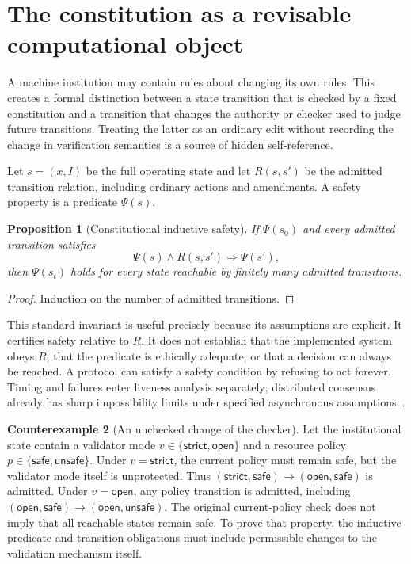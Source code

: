\documentclass[11pt,letterpaper]{article}
\theoremstyle{plain}
\newtheorem{proposition}{Proposition}[section]
\theoremstyle{definition}
\newtheorem{counterexample}[proposition]{Counterexample}
\theoremstyle{remark}
\begin{document}
\section{The constitution as a revisable computational object}\label{sec:constitution}

A machine institution may contain rules about changing its own rules. This creates a formal distinction between a state transition that is checked by a fixed constitution and a transition that changes the authority or checker used to judge future transitions. Treating the latter as an ordinary edit without recording the change in verification semantics is a source of hidden self-reference.

Let $s=(x,I)$ be the full operating state and let $R(s,s')$ be the admitted transition relation, including ordinary actions and amendments. A safety property is a predicate $\Psi(s)$.

\begin{proposition}[Constitutional inductive safety]\label{prop:safety}
If $\Psi(s_0)$ and every admitted transition satisfies
\[
\Psi(s)\wedge R(s,s')\Longrightarrow\Psi(s'),
\]
then $\Psi(s_t)$ holds for every state reachable by finitely many admitted transitions.
\end{proposition}
\begin{proof}
Induction on the number of admitted transitions.
\end{proof}

This standard invariant is useful precisely because its assumptions are explicit. It certifies safety relative to $R$. It does not establish that the implemented system obeys $R$, that the predicate is ethically adequate, or that a decision can always be reached. A protocol can satisfy a safety condition by refusing to act forever. Timing and failures enter liveness analysis separately; distributed consensus already has sharp impossibility limits under specified asynchronous assumptions~\cite{flp}.

\begin{counterexample}[An unchecked change of the checker]\label{ex:checker}
Let the institutional state contain a validator mode $v\in\{\mathsf{strict},\mathsf{open}\}$ and a resource policy $p\in\{\mathsf{safe},\mathsf{unsafe}\}$. Under $v=\mathsf{strict}$, the current policy must remain safe, but the validator mode itself is unprotected. Thus $(\mathsf{strict},\mathsf{safe})\to(\mathsf{open},\mathsf{safe})$ is admitted. Under $v=\mathsf{open}$, any policy transition is admitted, including $(\mathsf{open},\mathsf{safe})\to(\mathsf{open},\mathsf{unsafe})$. The original current-policy check does not imply that all reachable states remain safe. To prove that property, the inductive predicate and transition obligations must include permissible changes to the validation mechanism itself.
\end{counterexample}
\end{document}
